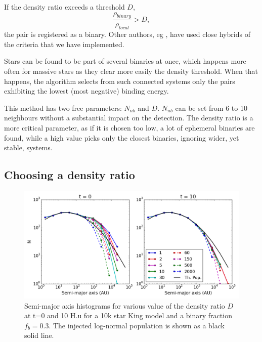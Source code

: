 If the density ratio exceeds a threshold $D$, 
\begin{equation}
\label{Eq:density_ratio}
\frac{ \rho_{binary} }{ \rho_{local} } > D,
\end{equation}
the pair is registered as a binary.  Other authors, eg \cite{Parker2009,Lomax2015}, have used close hybrids of the criteria that we have implemented.

Stars can be found to be part of several binaries at once, which happens more often for massive stars as they clear more easily the density threshold. When that happens, the algorithm selects from such connected systems only the pairs exhibiting the lowest (most negative) binding energy.

This method has two free parameters: $N_{nb}$ and $D$. $N_{nb}$ can be set from 6 to 10 neighbours without a substantial impact on the detection. The density ratio is a more critical parameter, as if it is chosen too low, a lot of ephemeral binaries are found, while a high value picks only the closest binaries, ignoring wider, yet stable, systems.



\subsection{Choosing a density ratio}



\begin{figure}
\begin{center}
\includegraphics[width=\textwidth]{Figures/5_sm_ratios}
\caption{Semi-major axis histograms for various value of the density ratio $D$ at t=0 and 10 H.u for a 10k star King model and a binary fraction $f_b =0.3$. The injected log-normal population is shown as a black solid line.}
\label{Fig:5_sm_ratios}
\end{center}
\end{figure}



